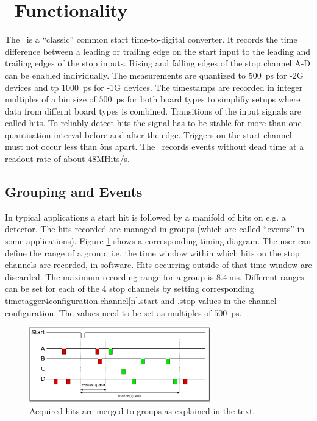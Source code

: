 \section{\deviceName\ Functionality}
	The \deviceName\ is a ``classic'' common start time-to-digital converter. 
	It records the time difference between a leading or trailing edge on the start input to the leading and trailing edges of the stop inputs. 
	Rising and falling edges of the stop channel A-D can be enabled individually. The measurements are quantized to $500$~ps for -2G devices and tp $1000$~ps for -1G devices. 
	The timestamps are recorded in integer multiples of a bin size of $500$~ps for both board types to simplifiy setups where data from differnt board types is combined.
	Transitions of the input signals are called hits. To reliably detect hits the signal has to be stable for more than one quantisation interval before and after the edge.  
	Triggers on the start channel must not occur less than 5ns apart. The \deviceName\ records events without dead time at a readout rate of about 48MHits/s.

	\subsection{Grouping and Events}
	In typical applications a start hit is followed by a manifold of hits on e.g. a detector. 
	The hits recorded are managed in groups (which are called ``events'' in some applications). 
	Figure \ref{fig:grouping} shows a corresponding timing diagram. The user can define the range of a group, i.e. the time window within which hits 
	on the stop channels are recorded, in software. Hits occurring outside of that time window are discarded. 
	The maximum recording range for a group is $8.4~$ms. Different ranges can be set for each of the 4 stop channels by setting corresponding timetagger4\tu configuration.channel[n].start and .stop values in the channel configuration. 
	The values need to be set as multiples of $500$~ps.
		\begin{figure}[ht]
			\begin{center}
				\includegraphics[width=0.7\textwidth]{figures/grouping.pdf}
				\caption{Acquired hits are merged to groups as explained in the text.\label{fig:grouping}}
			\end{center}
		\end{figure}
	
